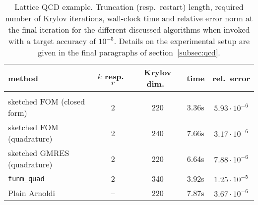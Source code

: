 \begin{table}
\centering
\caption{Lattice QCD example. Truncation (resp.\ restart) length, required number of Krylov iterations, wall-clock time and relative error norm at the final iteration for the different discussed algorithms when invoked with a target accuracy of $10^{-5}$. Details on the experimental setup are given in the final paragraphs of section~\ref{subsec:qcd}.}
\label{tab:qcd}
\begin{tabular}{l|cccc}
method & $k$ resp.\ $r$ & Krylov dim.\ & time & rel.\ error \\[1mm]
\hline\hline\\[-2mm]
sketched FOM (closed form) & 2 & 220 & 3.36s & $5.93 \cdot 10^{-6}$ \\
sketched FOM (quadrature) & 2 & 240 & 7.66s & $3.17 \cdot 10^{-6}$ \\
sketched GMRES (quadrature) & 2 & 220 & 6.64s & $7.88 \cdot 10^{-6}$ \\
\texttt{funm\_quad} &  2 & 340 & 3.92s & $1.25 \cdot 10^{-5}$ \\
Plain Arnoldi & -- & 220 & 7.87s & $3.67 \cdot 10^{-6}$ \\
\end{tabular}
\end{table}